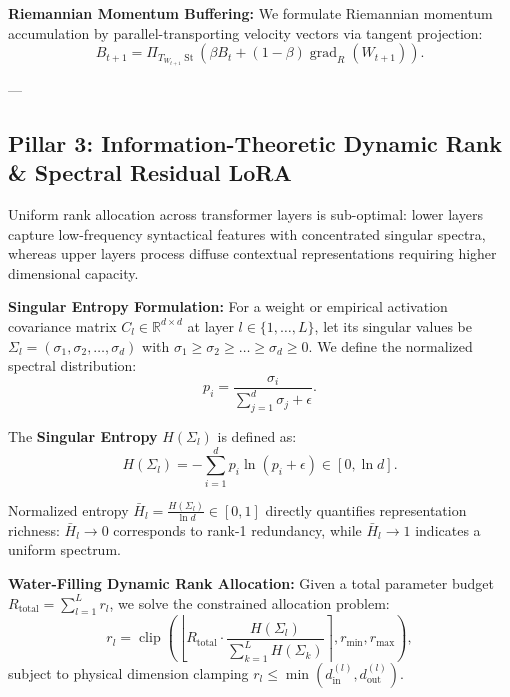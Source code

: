 \documentclass[10pt,twocolumn,letterpaper]{article}
\begin{document}
\textbf{Riemannian Momentum Buffering:} We formulate Riemannian momentum accumulation by parallel-transporting velocity vectors via tangent projection:
\begin{equation}
B_{t+1} = \Pi_{T_{W_{t+1}} \operatorname{St}}\left( \beta B_t + (1 - \beta) \operatorname{grad}_R(W_{t+1}) \right).
\end{equation}

---

\subsection{Pillar 3: Information-Theoretic Dynamic Rank \& Spectral Residual LoRA}
\label{sec:dynamic_rank}

Uniform rank allocation across transformer layers is sub-optimal: lower layers capture low-frequency syntactical features with concentrated singular spectra, whereas upper layers process diffuse contextual representations requiring higher dimensional capacity.

\textbf{Singular Entropy Formulation:} For a weight or empirical activation covariance matrix $C_l \in \mathbb{R}^{d \times d}$ at layer $l \in \{1, \dots, L\}$, let its singular values be $\Sigma_l = (\sigma_1, \sigma_2, \dots, \sigma_d)$ with $\sigma_1 \ge \sigma_2 \ge \dots \ge \sigma_d \ge 0$. We define the normalized spectral distribution:
\begin{equation}
p_i = \frac{\sigma_i}{\sum_{j=1}^d \sigma_j + \epsilon}.
\end{equation}

The \textbf{Singular Entropy} $H(\Sigma_l)$ is defined as:
\begin{equation}
\label{eq:singular_entropy}
H(\Sigma_l) = -\sum_{i=1}^d p_i \ln(p_i + \epsilon) \in [0, \ln d].
\end{equation}

Normalized entropy $\bar{H}_l = \frac{H(\Sigma_l)}{\ln d} \in [0, 1]$ directly quantifies representation richness: $\bar{H}_l \to 0$ corresponds to rank-1 redundancy, while $\bar{H}_l \to 1$ indicates a uniform spectrum.

\textbf{Water-Filling Dynamic Rank Allocation:} Given a total parameter budget $R_{\text{total}} = \sum_{l=1}^L r_l$, we solve the constrained allocation problem:
\begin{equation}
r_l = \operatorname{clip}\left( \left\lfloor R_{\text{total}} \cdot \frac{H(\Sigma_l)}{\sum_{k=1}^L H(\Sigma_k)} \right\rceil, r_{\min}, r_{\max} \right),
\end{equation}
subject to physical dimension clamping $r_l \le \min(d_{\text{in}}^{(l)}, d_{\text{out}}^{(l)})$.
\end{document}
